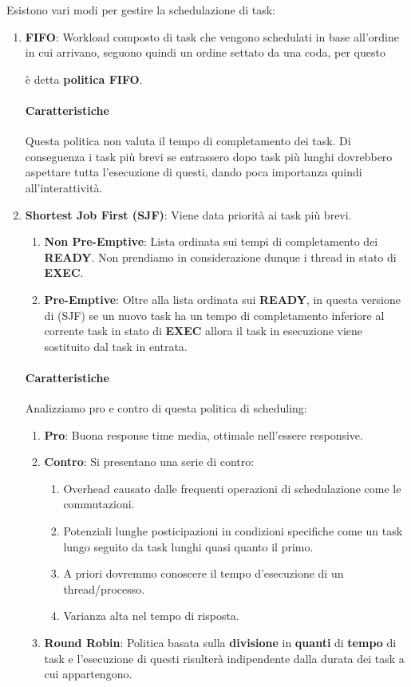 \documentclass{article}
\begin{document}
Esistono vari modi per gestire la schedulazione di task:

\begin{enumerate}
    \item \textbf{FIFO}: Workload composto di task che vengono schedulati in base all'ordine in cui arrivano, seguono quindi un ordine settato da una coda, per questo 
    
    è detta \textbf{politica FIFO}.
    \vspace*{-10px}
    \paragraph{Caratteristiche} Questa politica non valuta il tempo di completamento dei task. Di conseguenza i task più brevi se entrassero dopo task più lunghi dovrebbero aspettare tutta l'esecuzione di questi, dando poca importanza quindi all'interattività.
    \item \textbf{Shortest Job First (SJF)}: Viene data priorità ai task più brevi.
    \begin{enumerate}
        \item \textbf{Non Pre-Emptive}: Lista ordinata sui tempi di completamento dei \textbf{READY}. Non prendiamo in considerazione dunque i thread in stato di \textbf{EXEC}.
        \item \textbf{Pre-Emptive}: Oltre alla lista ordinata sui \textbf{READY}, in questa versione di (SJF) se un nuovo task ha un tempo di completamento inferiore al corrente task in stato di \textbf{EXEC} allora il task in esecuzione viene sostituito dal task in entrata. 
    \end{enumerate}
    \vspace*{-10px}
    \paragraph{Caratteristiche} Analizziamo pro e contro di questa politica di scheduling:
    \begin{enumerate}
        \item \textbf{Pro}: Buona response time media, ottimale nell'essere responsive.
        \item \textbf{Contro}: Si presentano una serie di contro:
        \begin{enumerate}
            \item Overhead causato dalle frequenti operazioni di schedulazione come le commutazioni.
            \item Potenziali lunghe posticipazioni in condizioni specifiche come un task lungo seguito da task lunghi quasi quanto il primo.
            \item A priori dovremmo conoscere il tempo d'esecuzione di un thread/processo.
            \item Varianza alta nel tempo di risposta.
        \end{enumerate}
    \vspace*{5px}
    \item \textbf{Round Robin}: Politica basata sulla \textbf{divisione} in \textbf{quanti} di \textbf{tempo} di task e l'esecuzione di questi risulterà indipendente dalla durata dei task a cui appartengono.
    \vspace*{-10px}

\end{enumerate}
\end{enumerate}
\end{document}
